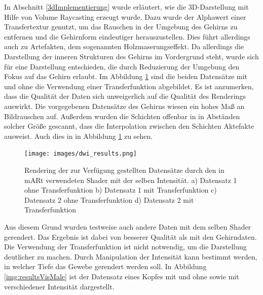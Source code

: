 In Abschnitt \ref{3dImplementierung} wurde erläutert, wie die 3D-Darstellung mit Hilfe von Volume Raycasting erzeugt wurde. 
Dazu wurde der Alphawert einer Transfertextur genutzt, um das Rauschen in der Umgebung des Gehirns zu entfernen und die Gehirnform eindeutiger herauszustellen. Dies führt allerdings auch zu Artefakten, dem sogenannten Holzmaserungseffekt. Da allerdings die Darstellung der inneren Strukturen des Gehirns im Vordergrund steht, wurde sich für eine Darstellung entschieden, die durch Reduzierung der Umgebung den Fokus auf das Gehirn erlaubt. 
Im Abbildung \ref{img:resultsDWI} sind die beiden Datensätze mit und ohne die Verwendung einer Transferfunktion abgebildet. 
Es ist anzumerken, dass die Qualität der Daten sich unweigerlich auf die Qualität des Renderings auswirkt. Die vorgegebenen Datensätze des Gehirns wiesen ein hohes Maß an Bildrauschen auf. Außerdem wurden die Schichten offenbar in in Abständen solcher Größe gescannt, dass die Interpolation zwischen den Schichten Aktefakte ausweist. Auch dies in in Abbildung \ref{img:resultsDWI} zu sehen.

\begin{figure}[!htb]
	\centering
	\texttt{[image: images/dwi\_results.png]}
	\caption{Rendering der zur Verfügung gestellten Datensätze durch den in mARt verwendeten Shader mit der selben Intensität. a) Datensatz 1 ohne Transferfunktion b) Datensatz 1 mit Transferfunktion c) Datensatz 2 ohne Transferfunktion d) Datensatz 2 mit Transferfunktion}
	\label{img:resultsDWI}
\end{figure}
\FloatBarrier
  
Aus diesem Grund wurden testweise auch andere Daten mit dem selben Shader gerendert. Das Ergebnis ist dabei von besserer Qualität als mit den Gehirndaten. Die Verwendung der Transferfunktion ist nicht notwendig, um die Darstellung deutlicher zu machen. Durch Manipulation der Intensität kann bestimmt werden, in welcher Tiefe das Gewebe gerendert werden soll. In Abbildung \ref{img:resultsVisMale} ist der Datensatz eines Kopfes mit und ohne sowie mit verschiedener Intensität dargestellt.
  
